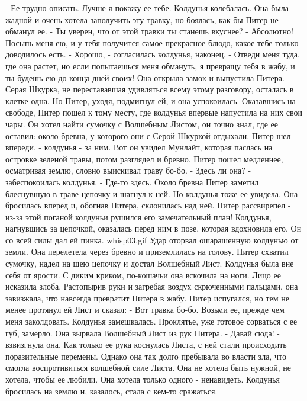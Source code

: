     - Ее трудно описать. Лучше я покажу ее тебе.
    Колдунья колебалась. Она была жадной и очень хотела заполучить эту 
травку, но боялась, как бы Питер не обманул ее.
    - Ты уверен, что от этой травки ты станешь вкуснее?
    - Абсолютно! Посыпь меня ею, и у тебя получится самое прекрасное 
блюдо, какое тебе только доводилось есть.
    - Хорошо, - согласилась колдунья, наконец. - Отведи меня туда, где 
она растет, но если попытаешься меня обмануть, я превращу тебя в жабу, 
и ты будешь ею до конца дней своих!
    Она открыла замок и выпустила Питера. Серая Шкурка, не 
перестававшая удивляться всему этому разговору, осталась в клетке 
одна. Но Питер, уходя, подмигнул ей, и она успокоилась.
    Оказавшись на свободе, Питер пошел к тому месту, где колдунья 
впервые напустила на них свои чары. Он хотел найти сумочку с Волшебным 
Листом, он точно знал, где ее оставил: около бревна, у которого они с 
Серой Шкуркой отдыхали.
    Питер шел впереди, - колдунья - за ним. Вот он увидел Мунлайт, 
которая паслась на островке зеленой травы, потом разглядел и бревно. 
Питер пошел медленнее, осматривая землю, словно выискивал траву бо-бо.
    - Здесь ли она? - забеспокоилась колдунья.
    - Где-то здесь.
    Около бревна Питер заметил блеснувшую в траве цепочку и шагнул к 
ней. Но колдунья тоже ее увидела. Она бросилась вперед и, обогнав 
Питера, склонилась над ней.
    Питер рассвирепел - из-за этой поганой колдуньи рушился его 
замечательный план! Колдунья, нагнувшись за цепочкой, оказалась перед 
ним в позе, которая вдохновила его. Он со всей силы дал ей пинка.
    {whisp03.gif}
    Удар оторвал ошарашенную колдунью от земли. Она перелетела через 
бревно и приземлилась на голову. Питер схватил сумочку, надел на шею 
цепочку и достал Волшебный Лист.
    Колдунья была вне себя от ярости. С диким криком, по-кошачьи она 
вскочила на ноги. Лицо ее исказила злоба. Растопырив руки и загребая 
воздух скрюченными пальцами, она завизжала, что навсегда превратит 
Питера в жабу.
    Питер испугался, но тем не менее протянул ей Лист и сказал:
    - Вот травка бо-бо. Возьми ее, прежде чем меня заколдовать.
    Колдунья замешкалась. Проклятье, уже готовое сорваться с ее губ, 
замерло. Она вырвала Волшебный Лист из рук Питера.
    - Давай сюда! - взвизгнула она.
    Как только ее рука коснулась Листа, с ней стали происходить 
поразительные перемены. Однако она так долго пребывала во власти зла, 
что смогла воспротивиться волшебной силе Листа. Она не хотела быть 
нужной, не хотела, чтобы ее любили. Она хотела только одного - 
ненавидеть.
    Колдунья бросилась на землю и, казалось, стала с кем-то сражаться. 
